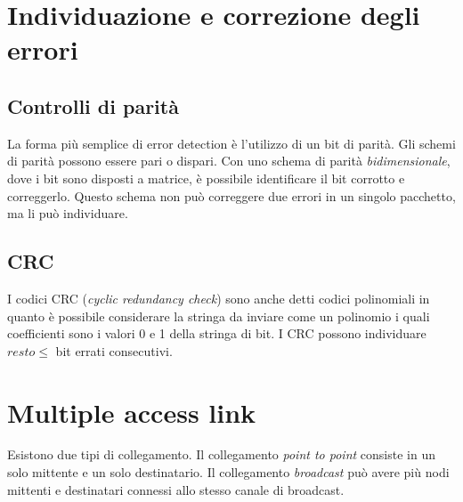 \documentclass[11pt]{book}
\begin{document}
\section*{Individuazione e correzione degli errori}
\subsection*{Controlli di parità}
La forma più semplice di error detection è l'utilizzo di un bit di parità. Gli schemi di parità possono essere pari o dispari.
Con uno schema di parità \textit{bidimensionale}, dove i bit sono disposti a matrice, è possibile identificare il bit 
corrotto e correggerlo. Questo schema non può correggere due errori in un singolo pacchetto, ma li può individuare.
\subsection*{CRC}
I codici CRC (\textit{cyclic redundancy check}) sono anche detti codici polinomiali in quanto è possibile considerare la 
stringa da inviare come un polinomio i quali coefficienti sono i valori 0 e 1 della stringa di bit. I CRC possono individuare 
$resto\leq$ bit errati consecutivi.
\section*{Multiple access link}
Esistono due tipi di collegamento. Il collegamento \textit{point to point} consiste in un solo mittente e un solo destinatario.
Il collegamento \textit{broadcast} può avere più nodi mittenti e destinatari connessi allo stesso canale di broadcast. 
\end{document}
